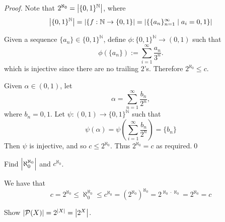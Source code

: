 \documentclass[notoc,notitlepage]{tufte-book}
\begin{document}
\begin{proof}
  Note that $2^{\aleph_0} = \left|\{ 0, 1\}^{\mathbb{N}} \right|$, where
  \begin{equation*}
    \left| \{0, 1 \}^{\mathbb{N}} \right| = \left| \{ f : \mathbb{N} \to \{0, 1\} \right| = \left| \{ \{ a_n \}_{n = 1}^{\infty} \mid a_i = 0, 1 \} \right|
  \end{equation*}

  Given a sequence $\{ a_n \} \in \{ 0, 1 \}^{\mathbb{N}}$, define $\phi : \{ 0, 1 \}^{\mathbb{N}} \to (0, 1)$ such that
  \begin{equation*}
    \phi\left( \{ a_n \} \right) := \sum_{i=1}^{\infty} \frac{a_n}{3^n}.
  \end{equation*}
  which is injective since there are no trailing $2$'s. Therefore $2^{\aleph_0} \leq c$.

  Given $\alpha \in (0, 1)$, let
  \begin{equation*}
    \alpha = \sum_{n=1}^{\infty} \frac{b_n}{2^n},
  \end{equation*}
  where $b_n = 0, 1$. Let $\psi : (0, 1) \to \{0, 1\}^{\mathbb{N}}$ such that
  \begin{equation*}
    \psi(\alpha) = \psi\left( \sum_{i=1}^{\infty} \frac{b_n}{2^n} \right) = \{ b_n \}
  \end{equation*}
  Then $\psi$ is injective, and so $c \leq 2^{\aleph_0}$. Thus $2^{\aleph_0} = c$ as required.\qed
\end{proof}

\begin{eg}
  Find $\left|\aleph_0^{\aleph_0}\right|$ and $c^{\aleph_0}$.
\end{eg}

\begin{solution}
  We have that
  \begin{equation*}
    c = 2^{\aleph_0} \leq \aleph_0^{\aleph_0} \leq c^{\aleph_0} = \left( 2^{\aleph_0} \right)^{\aleph_0} = 2^{\aleph_0 \cdot \aleph_0} = 2^{\aleph_0} = c
  \end{equation*}
\end{solution}

\begin{eg}
  Show $\left|\mathcal{P}(X)\right| = 2^{\left|X\right|} = \left|2^X\right|$.
\end{eg}
\end{document}
